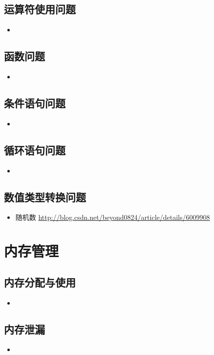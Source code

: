 \documentclass[UTF8,a4paper,12pt]{ctexbook} %
\begin{document}
		\subsection{运算符使用问题}
			\begin{itemize}
				\item 
			\end{itemize}
		\subsection{函数问题}
			\begin{itemize}
				\item 
			\end{itemize}
		\subsection{条件语句问题}
			\begin{itemize}
				\item 
			\end{itemize}
		\subsection{循环语句问题}
			\begin{itemize}
				\item 
			\end{itemize}
		\subsection{数值类型转换问题}
			\begin{itemize}
				\item 随机数 \url{http://blog.csdn.net/beyond0824/article/details/6009908}
			\end{itemize}
\section{内存管理}
		\subsection{内存分配与使用}
			\begin{itemize}
				\item 
			\end{itemize}
		\subsection{内存泄漏}
			\begin{itemize}
				\item 
			\end{itemize}
\end{document}
